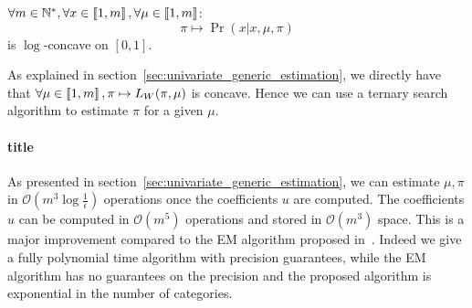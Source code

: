 \begin{thm}
    $\forall m \in \mathbb{N}^*, \forall x \in \left\llbracket1, m\right\rrbracket, \forall \mu \in \left\llbracket1, m\right\rrbracket$:
    \[\pi \mapsto \Pr(x | x, \mu, \pi) \] 
    is $\log$-concave on $[0, 1]$.
\end{thm}

As explained in section~\ref{sec:univariate_generic_estimation}, we directly have that $\forall \mu \in \left\llbracket1, m\right\rrbracket, \pi \mapsto L_W(\pi, \mu)$ is concave. Hence we can use a ternary search algorithm to estimate $\pi$ for a given $\mu$.

\paragraph{title}

As presented in section~\ref{sec:univariate_generic_estimation}, we can estimate $\mu, \pi$ in $\mathcal O(m^3 \log \frac{1}{\epsilon})$ operations once the coefficients $u$ are computed. The coefficients $u$ can be computed in $\mathcal O(m^5)$ operations and stored in $\mathcal O(m^3)$ space. This is a major improvement compared to the EM algorithm proposed in~\cite{biernacki2016model}. Indeed we give a fully polynomial time algorithm with precision guarantees, while the EM algorithm has no guarantees on the precision and the proposed algorithm is exponential in the number of categories.




